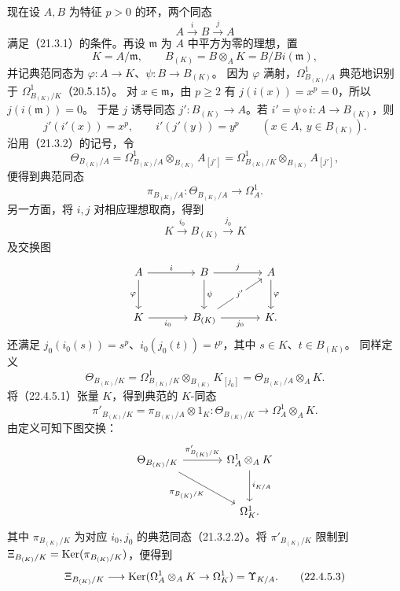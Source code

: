 现在设 $A,B$ 为特征 $p>0$ 的环，两个同态
\[
 A\xrightarrow{i}B\xrightarrow{j}A
\]
满足（21.3.1）的条件。再设 $\mathfrak m$ 为 $A$ 中平方为零的理想，置
\[
 K=A/\mathfrak m,\qquad B_{(K)}=B\otimes_AK=B/Bi(\mathfrak m),
\]
并记典范同态为 $\varphi:A\to K$、$\psi:B\to B_{(K)}$。
因为 $\varphi$ 满射，$\Omega^1_{B_{(K)}/A}$ 典范地识别于 $\Omega^1_{B_{(K)}/K}$（20.5.15）。
对 $x\in\mathfrak m$，由 $p\ge2$ 有 $j(i(x))=x^p=0$，所以 $j(i(\mathfrak m))=0$。
于是 $j$ 诱导同态 $j':B_{(K)}\to A$。若 $i'=\psi\circ i:A\to B_{(K)}$，则
\[
 j'(i'(x))=x^p,\qquad i'(j'(y))=y^p
 \qquad(x\in A,\ y\in B_{(K)}).
\]
沿用（21.3.2）的记号，令
\[
 \Theta_{B_{(K)}/A}
 =\Omega^1_{B_{(K)}/A}\otimes_{B_{(K)}}A_{[j']}
 =\Omega^1_{B_{(K)}/K}\otimes_{B_{(K)}}A_{[j']},
\]
便得到典范同态
\begin{equation}
 \pi_{B_{(K)}/A}:\Theta_{B_{(K)}/A}\longrightarrow\Omega^1_A.
 \tag{22.4.5.1}
\end{equation}
另一方面，将 $i,j$ 对相应理想取商，得到
\[
 K\xrightarrow{i_0}B_{(K)}\xrightarrow{j_0}K
\]
及交换图
\[
 \begin{tikzcd}[column sep=large,row sep=large]
 A\arrow[r,"i"]\arrow[d,"\varphi"']&B\arrow[r,"j"]\arrow[d,"\psi"]&A\arrow[d,"\varphi"]\\
 K\arrow[r,"i_0"']&B_{(K)}\arrow[r,"j_0"']\arrow[ur,"j'" description]&K.
 \end{tikzcd}
\]
还满足 $j_0(i_0(s))=s^p$、$i_0(j_0(t))=t^p$，其中 $s\in K$、$t\in B_{(K)}$。
同样定义
\[
 \Theta_{B_{(K)}/K}
 =\Omega^1_{B_{(K)}/K}\otimes_{B_{(K)}}K_{[j_0]}
 =\Theta_{B_{(K)}/A}\otimes_AK.
\]
将（22.4.5.1）张量 $K$，得到典范的 $K$-同态
\begin{equation}
 \pi'_{B_{(K)}/K}=\pi_{B_{(K)}/A}\otimes1_K:
 \Theta_{B_{(K)}/K}\longrightarrow\Omega^1_A\otimes_AK.
 \tag{22.4.5.2}
\end{equation}
由定义可知下图交换：
\[
 \begin{tikzcd}[column sep=large,row sep=large]
 \Theta_{B_{(K)}/K}\arrow[r,"\pi'_{B_{(K)}/K}"]\arrow[dr,"\pi_{B_{(K)}/K}"']&
 \Omega^1_A\otimes_AK\arrow[d,"i_{K/A}"]\\
 &\Omega^1_K.
 \end{tikzcd}
\]
其中 $\pi_{B_{(K)}/K}$ 为对应 $i_0,j_0$ 的典范同态（21.3.2.2）。将 $\pi'_{B_{(K)}/K}$ 限制到
$\Xi_{B_{(K)}/K}=\operatorname{Ker}(\pi_{B_{(K)}/K})$，便得到
\begin{equation}
 \Xi_{B_{(K)}/K}\longrightarrow
 \operatorname{Ker}(\Omega^1_A\otimes_AK\to\Omega^1_K)=\Upsilon_{K/A}.
 \tag{22.4.5.3}
\end{equation}

